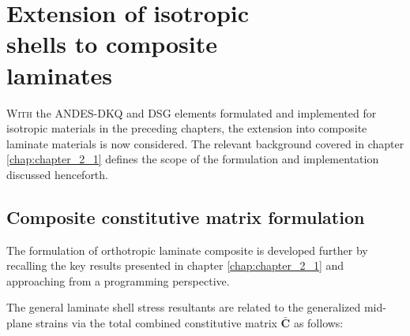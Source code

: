 




\chapter[Extension of isotropic shells to composite laminates]{Extension of isotropic \\ shells to composite \\ laminates}
\label{chap:chapter_composite_formulation_implementation}

\renewcommand{\Thema}{Extension of shells to composite laminates}

\lettrine[lines=2]{W}{ith} the ANDES-DKQ and DSG elements formulated and implemented for isotropic materials in the preceding chapters, the extension into composite laminate materials is now considered. The relevant background covered in chapter \ref{chap:chapter_2_1} defines the scope of the formulation and implementation discussed henceforth.

\section{Composite constitutive matrix formulation}
The formulation of orthotropic laminate composite is developed further by recalling the key results presented in chapter \ref{chap:chapter_2_1} and approaching from a programming perspective.

The general laminate shell stress resultants are related to the generalized mid-plane strains via the total combined constitutive matrix $\bar{\mathbf{C}}$ as follows:

